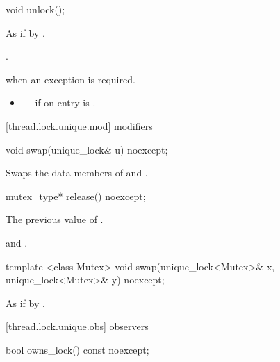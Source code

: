 %
\begin{itemdecl}
void unlock();
\end{itemdecl}

\begin{itemdescr}
\pnum\effects As if by .

\pnum\postconditions {}.

\pnum\throws {} when
an exception is required.

\pnum \errors
\begin{itemize}
\item {} --- if on entry  is .
\end{itemize}
\end{itemdescr}

[thread.lock.unique.mod]{ modifiers}

%
\begin{itemdecl}
void swap(unique_lock& u) noexcept;
\end{itemdecl}

\begin{itemdescr}
\pnum\effects Swaps the data members of  and .
\end{itemdescr}

%
\begin{itemdecl}
mutex_type* release() noexcept;
\end{itemdecl}

\begin{itemdescr}
\pnum\returns The previous value of .

\pnum\postconditions {} and .
\end{itemdescr}

%
\begin{itemdecl}
template <class Mutex>
  void swap(unique_lock<Mutex>& x, unique_lock<Mutex>& y) noexcept;
\end{itemdecl}

\begin{itemdescr}
\pnum\effects As if by .
\end{itemdescr}

[thread.lock.unique.obs]{ observers}

%
\begin{itemdecl}
bool owns_lock() const noexcept;
\end{itemdecl}

